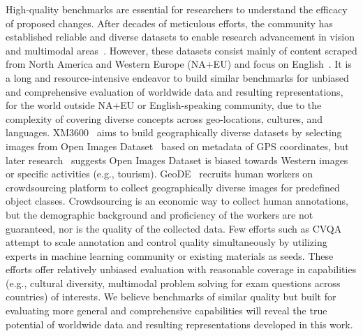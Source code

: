 High-quality benchmarks are essential for researchers to understand the efficacy of proposed changes. After decades of meticulous efforts, the community has established reliable and diverse datasets to enable research advancement in vision and multimodal areas~\citep{deng2009imagenet,russakovsky2015imagenet,radford2021learning}. However, these datasets consist mainly of content scraped from North America and Western Europe (NA+EU) and focus on English~\citep{shankar2017no,de2019does}. It is a long and resource-intensive endeavor to build similar benchmarks for unbiased and comprehensive evaluation of worldwide data and resulting representations, for the world outside NA+EU or English-speaking community, due to the complexity of covering diverse concepts across geo-locations, cultures, and languages. XM3600~\citep{thapliyal2022crossmodal} aims to build geographically diverse datasets by selecting images from Open Images Dataset~\citep{kuznetsova2020open} based on metadata of GPS coordinates, but later research~\citep{pouget2024no} suggests Open Images Dataset is biased towards Western images or specific activities (e.g., tourism). 
GeoDE~\citep{ramaswamy2023geode} recruits human workers on crowdsourcing platform to collect geographically diverse images for predefined object classes. Crowdsourcing is an economic way to collect human annotations, but the demographic background and proficiency of the workers are not guaranteed, nor is the quality of the collected data.
Few efforts such as CVQA~\citep{mogrovejo2024cvqa}
attempt to scale annotation and control quality simultaneously 
by utilizing experts in machine learning community or existing materials as seeds. These efforts offer relatively unbiased evaluation with reasonable coverage in capabilities (e.g., cultural diversity, multimodal problem solving for exam questions across countries) of interests. We believe benchmarks of similar quality but built for evaluating more general and comprehensive capabilities will reveal the true potential of worldwide data and resulting representations developed in this work.
